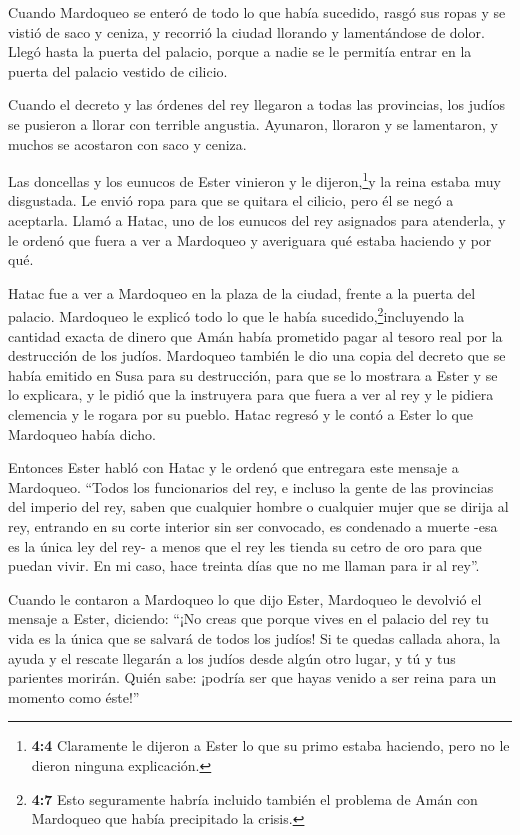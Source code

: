  Cuando Mardoqueo se enteró de todo lo que había sucedido,
rasgó sus ropas y se vistió de saco y ceniza, y recorrió la ciudad
llorando y lamentándose de dolor.  Llegó hasta la puerta del
palacio, porque a nadie se le permitía entrar en la puerta del palacio
vestido de cilicio.

 Cuando el decreto y las órdenes del rey llegaron a todas
las provincias, los judíos se pusieron a llorar con terrible angustia.
Ayunaron, lloraron y se lamentaron, y muchos se acostaron con saco y
ceniza.

 Las doncellas y los eunucos de Ester vinieron y le
dijeron,\footnote{\textbf{4:4} Claramente le dijeron a Ester lo que su
  primo estaba haciendo, pero no le dieron ninguna explicación.}y la
reina estaba muy disgustada. Le envió ropa para que se quitara el
cilicio, pero él se negó a aceptarla.  Llamó a Hatac, uno de
los eunucos del rey asignados para atenderla, y le ordenó que fuera a
ver a Mardoqueo y averiguara qué estaba haciendo y por qué.

 Hatac fue a ver a Mardoqueo en la plaza de la ciudad,
frente a la puerta del palacio.  Mardoqueo le explicó todo
lo que le había sucedido,\footnote{\textbf{4:7} Esto seguramente habría
  incluido también el problema de Amán con Mardoqueo que había
  precipitado la crisis.}incluyendo la cantidad exacta de dinero que
Amán había prometido pagar al tesoro real por la destrucción de los
judíos.  Mardoqueo también le dio una copia del decreto que
se había emitido en Susa para su destrucción, para que se lo mostrara a
Ester y se lo explicara, y le pidió que la instruyera para que fuera a
ver al rey y le pidiera clemencia y le rogara por su pueblo.
 Hatac regresó y le contó a Ester lo que Mardoqueo había
dicho.

 Entonces Ester habló con Hatac y le ordenó que entregara
este mensaje a Mardoqueo.  ``Todos los funcionarios del
rey, e incluso la gente de las provincias del imperio del rey, saben que
cualquier hombre o cualquier mujer que se dirija al rey, entrando en su
corte interior sin ser convocado, es condenado a muerte -esa es la única
ley del rey- a menos que el rey les tienda su cetro de oro para que
puedan vivir. En mi caso, hace treinta días que no me llaman para ir al
rey''.

 Cuando le contaron a Mardoqueo lo que dijo Ester,
 Mardoqueo le devolvió el mensaje a Ester, diciendo: ``¡No
creas que porque vives en el palacio del rey tu vida es la única que se
salvará de todos los judíos!  Si te quedas callada ahora,
la ayuda y el rescate llegarán a los judíos desde algún otro lugar, y tú
y tus parientes morirán. Quién sabe: ¡podría ser que hayas venido a ser
reina para un momento como éste!''

